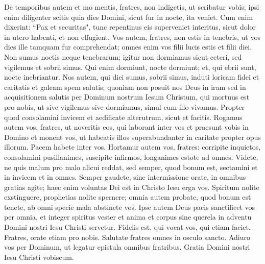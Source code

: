 \begin{biblechapter}  
\verse De temporibus autem et mo mentis, fratres, non indigetis, ut scribatur vobis; 
\verse ipsi enim diligenter scitis quia dies Domini, sicut fur in nocte, ita veniet. 
\verse Cum enim dixerint: “Pax et securitas", tunc repentinus eis superveniet interitus, sicut dolor in utero habenti, et non effugient. 
\verse Vos autem, fratres, non estis in tenebris, ut vos dies ille tamquam fur comprehendat; 
\verse omnes enim vos filii lucis estis et filii diei. Non sumus noctis neque tenebrarum; 
\verse igitur non dormiamus sicut ceteri, sed vigilemus et sobrii simus. 
\verse Qui enim dormiunt, nocte dormiunt; et, qui ebrii sunt, nocte inebriantur.  
\verse Nos autem, qui diei sumus, sobrii simus, induti loricam fidei et caritatis et galeam spem salutis; 
\verse quoniam non posuit nos Deus in iram sed in acquisitionem salutis per Dominum nostrum Iesum Christum, 
\verse qui mortuus est pro nobis, ut sive vigilemus sive dormiamus, simul cum illo vivamus. 
\verse Propter quod consolamini invicem et aedificate alterutrum, sicut et facitis. 
\verse Rogamus autem vos, fratres, ut noveritis eos, qui laborant inter vos et praesunt vobis in Domino et monent vos, 
\verse ut habeatis illos superabundanter in caritate propter opus illorum. Pacem habete inter vos. 
\verse Hortamur autem vos, fratres: corripite inquietos, consolamini pusillanimes, suscipite infirmos, longanimes estote ad omnes. 
\verse Videte, ne quis malum pro malo alicui reddat, sed semper, quod bonum est, sectamini et in invicem et in omnes. 
\verse Semper gaudete, 
\verse sine intermissione orate, 
\verse in omnibus gratias agite; haec enim voluntas Dei est in Christo Iesu erga vos. 
\verse Spiritum nolite exstinguere,  
\verse prophetias nolite spernere; 
\verse omnia autem probate, quod bonum est tenete, 
\verse ab omni specie mala abstinete vos. 
\verse Ipse autem Deus pacis sanctificet vos per omnia, et integer spiritus vester et anima et corpus sine querela in adventu Domini nostri Iesu Christi servetur. 
\verse Fidelis est, qui vocat vos, qui etiam faciet. 
\verse Fratres, orate etiam pro nobis. 
\verse Salutate fratres omnes in osculo sancto. 
\verse Adiuro vos per Dominum, ut legatur epistula omnibus fratribus. 
\verse Gratia Domini nostri Iesu Christi vobiscum.
\end{biblechapter}
